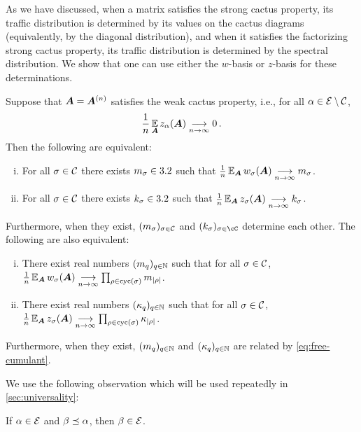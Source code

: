 As we have discussed, when a matrix satisfies the strong cactus property,
its traffic distribution is determined by its values on the cactus diagrams (equivalently, by the diagonal distribution),
and when it satisfies the factorizing strong cactus property,
its traffic distribution is determined by the spectral distribution.
We show that one can use either the $w$-basis or $z$-basis for these determinations.

\begin{lemma}
    \label{lem:diagonal-w-z}
    Suppose that ${\bm A} = {\bm A}^{(n)}$ satisfies the
    weak cactus property, i.e., for all $\alpha\in {\cal E}\setminus {\cal C}$,
    \[
        \frac 1n \operatorname*{\mathbb{E}}_{{\bm A}} z_\alpha({\bm A})\underset{n\to\infty}{\longrightarrow} 0\,.
    \]
    Then the following are equivalent:
    \begin{enumerate}[(i)]
        \item For all $\sigma \in {\cal C}$ there exists $m_\sigma \in 3.2$ such that $\frac 1n \operatorname*{\mathbb{E}}_{\bm A} w_\sigma({\bm A}) \underset{n\to\infty}{\longrightarrow} m_\sigma$.
        \item For all $\sigma \in {\cal C}$ there exists $k_\sigma \in 3.2$
        such that $\frac 1n \operatorname*{\mathbb{E}}_{\bm A} z_\sigma({\bm A}) \underset{n\to\infty}{\longrightarrow} k_\sigma$.
    \end{enumerate}
    Furthermore, when they exist, $(m_\sigma)_{\sigma \in {\cal C}}$ and $(k_\sigma)_{\sigma \in \cC}$ determine each other.
    The following are also equivalent:
    \begin{enumerate}[(i)]
        \item There exist real numbers $(m_q)_{q \in \mathbb{N}}$ such that for all $\sigma \in {\cal C}$, $\frac 1n \operatorname*{\mathbb{E}}_{\bm A} w_\sigma({\bm A}) \underset{n\to\infty}{\longrightarrow} \prod_{\rho \in \mathrm{cyc}(\sigma)} m_{|\rho|}$.
        \item There exist real numbers $(\kappa_q)_{q \in \mathbb{N}}$ such that for all $\sigma \in {\cal C}$, $\frac 1n \operatorname*{\mathbb{E}}_{\bm A} z_\sigma({\bm A}) \underset{n \to \infty}{\longrightarrow} \prod_{\rho \in \mathrm{cyc}(\sigma)} \kappa_{|\rho|}$.
    \end{enumerate}
    Furthermore, when they exist, $(m_q)_{q \in \mathbb{N}}$ and $(\kappa_q)_{q \in \mathbb{N}}$ are related by \cref{eq:free-cumulant}.
\end{lemma}

We use the
following observation which will be used repeatedly in \cref{sec:universality}:

\begin{lemma}\label{lem:contract-2ec}
    If $\alpha \in {\cal E}$ and $\beta \preceq \alpha$, then $\beta\in{\cal E}$.
\end{lemma}

